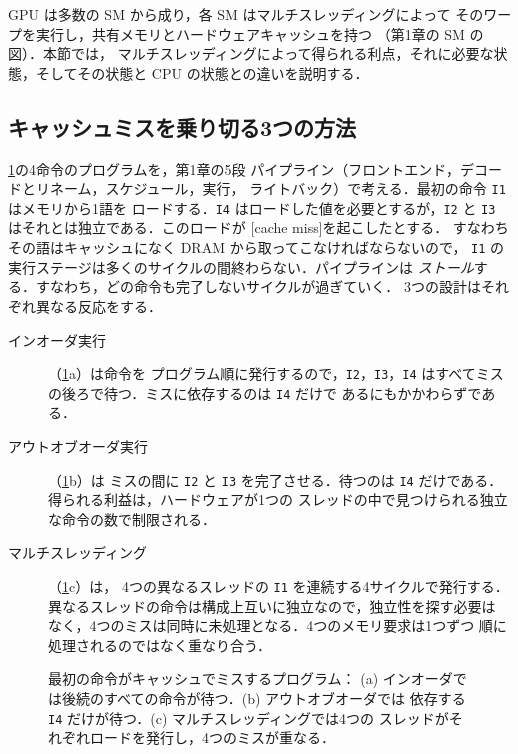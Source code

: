 \documentclass[../main.tex]{subfiles}
\begin{document}
GPU は多数の SM から成り，各 SM はマルチスレッディングによって
そのワープを実行し，共有メモリとハードウェアキャッシュを持つ
（第1章の SM の図）．本節では，
マルチスレッディングによって得られる利点，それに必要な状態，そしてその状態と
CPU の状態との違いを説明する．

\subsection{キャッシュミスを乗り切る3つの方法}

\cref{fig:l04-latency-hiding}の4命令のプログラムを，第1章の5段
パイプライン（フロントエンド，デコードとリネーム，スケジュール，実行，
ライトバック）で考える．最初の命令 \texttt{I1} はメモリから1語を
ロードする．\texttt{I4} はロードした値を必要とするが，\texttt{I2} と
\texttt{I3} はそれとは独立である．このロードが
[cache miss]を起こしたとする．
すなわちその語はキャッシュになく DRAM から取ってこなければならないので，
\texttt{I1} の実行ステージは多くのサイクルの間終わらない．パイプラインは
\emph{ストール}する．すなわち，どの命令も完了しないサイクルが過ぎていく．
3つの設計はそれぞれ異なる反応をする．
\begin{description}
  \item[インオーダ実行] （\cref{fig:l04-latency-hiding}a）は命令を
    プログラム順に発行するので，\texttt{I2}，\texttt{I3}，\texttt{I4}
    はすべてミスの後ろで待つ．ミスに依存するのは \texttt{I4} だけで
    あるにもかかわらずである．
  \item[アウトオブオーダ実行] （\cref{fig:l04-latency-hiding}b）は
    ミスの間に \texttt{I2} と \texttt{I3} を完了させる．待つのは
    \texttt{I4} だけである．得られる利益は，ハードウェアが1つの
    スレッドの中で見つけられる独立な命令の数で制限される．
  \item[マルチスレッディング] （\cref{fig:l04-latency-hiding}c）は，
    4つの異なるスレッドの \texttt{I1} を連続する4サイクルで発行する．
    異なるスレッドの命令は構成上互いに独立なので，独立性を探す必要は
    なく，4つのミスは同時に未処理となる．4つのメモリ要求は1つずつ
    順に処理されるのではなく重なり合う．
\end{description}

\begin{figure}[htbp]
  \centering
  
  \caption{最初の命令がキャッシュでミスするプログラム：
    (a) インオーダでは後続のすべての命令が待つ．(b) アウトオブオーダでは
    依存する \texttt{I4} だけが待つ．(c) マルチスレッディングでは4つの
    スレッドがそれぞれロードを発行し，4つのミスが重なる．}
  \label{fig:l04-latency-hiding}
\end{figure}
\end{document}
